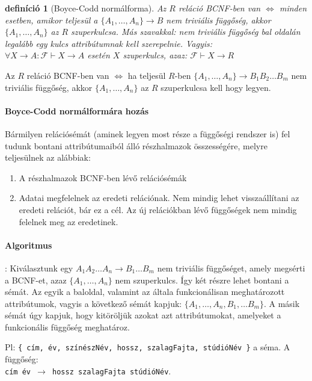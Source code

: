 \documentclass[fleqn,10pt,a4paper]{article}
\newcommand{\F}{\mathcal{F}}
\newcommand{\listazjbetu}{
  \renewcommand{\theenumi}{\alph{enumi}}
  \renewcommand{\labelenumi}{(\theenumi)}
}
\newenvironment{enumzjbetu}{\listazjbetu\begin{enumerate}}{\end{enumerate}}
\newenvironment{enumzjb}{\begin{enumzjbetu}}{\end{enumzjbetu}}
\theoremstyle{magyar}
\newtheorem{de}{definíció}[section]
\begin{document}
  \begin{de}[Boyce-Codd normálforma]Az $R$ reláció BCNF-ben van $\iff$ minden esetben, amikor teljesül a
    $\{A_1,\ldots,A_n\}\to B$ nem triviális függőség, akkor $\{A_1,\ldots,A_n\}$ az $R$ szuperkulcsa. Más szavakkal: nem
    triviális függőség bal oldalán legalább egy kulcs attribútumnak kell szerepelnie. Vagyis:\\
    $\forall X\to A\colon \F\vdash X\to A$ esetén $X$ szuperkulcs, azaz: $\mathcal F \vdash X\to R$
  \end{de}
  
  Az $R$ reláció BCNF-ben van $\iff$ ha teljesül $R$-ben  $\{A_1,\ldots,A_n\}\to B_1 B_2 \dots B_m$ nem triviális
  függőség, akkor $\{A_1,\ldots,A_n\}$ az $R$ szuperkulcsa kell hogy legyen.

  \paragraph{Boyce-Codd normálformára hozás}
  Bármilyen relációsémát (aminek legyen most része a függőségi rendszer is) fel tudunk bontani attribútumaiból álló
  részhalmazok összességére, melyre teljesülnek az alábbiak:
  \begin{enumzjb}
  \item A részhalmazok BCNF-ben lévő relációsémák
  \item Adatai megfelelnek az eredeti relációnak. Nem mindig lehet visszaállítani az eredeti relációt, bár ez a cél. Az
    új relációkban lévő függőségek nem mindig felelnek meg az eredetinek.
  \end{enumzjb}
  
  \paragraph{Algoritmus}: Kiválasztunk egy $A_1A_2\ldots A_n\to B_1\ldots B_m$ nem triviális függőséget, amely megsérti
  a BCNF-et, azaz $\{A_1,\ldots,A_n\}$ nem szuperkulcs. Így két részre lehet bontani a sémát. Az egyik a baloldal,
  valamint az általa funkcionálisan meghatározott attribútumok, vagyis a következő sémát kapjuk: $\{ A_1, \ldots, A_n,
  B_1, \ldots B_m\}$. A másik sémát úgy kapjuk, hogy kitöröljük azokat azt attribútumokat, amelyeket a funkcionális
  függőség meghatároz.
  
  Pl: \texttt{\{ cím, év, színészNév,  hossz, szalagFajta,  stúdióNév \}} a séma. A függőség:\\
  \texttt{cím év $\to$ hossz szalagFajta stúdióNév}.
\end{document}
